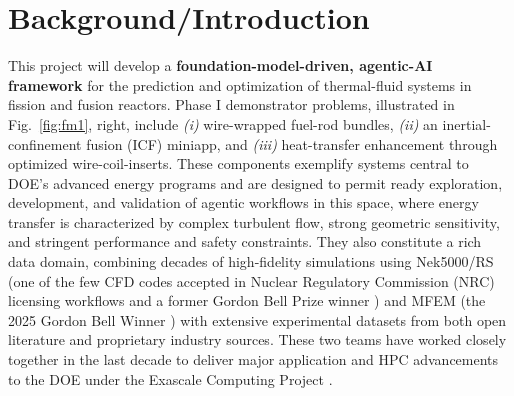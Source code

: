 

\section{Background/Introduction}

This project will develop a {\bf foundation-model-driven, agentic-AI framework}
\cite{Vinuesa2026XAI} for the prediction and optimization of thermal-fluid
systems in fission and fusion reactors.
  Phase I demonstrator problems, illustrated in Fig.~\ref{fig:fm1}, right, 
include 
{\em (i)} wire-wrapped fuel-rod bundles, 
{\em (ii)} an inertial-confinement fusion (ICF) miniapp, and 
{\em (iii)} heat-transfer enhancement through optimized wire-coil-inserts.
  These components exemplify systems central to DOE’s advanced energy
programs and are designed to permit ready exploration, development, and
validation of agentic workflows in this space, where
    energy transfer is characterized by complex turbulent flow, strong
geometric sensitivity, and stringent performance and safety constraints.
  They also constitute a rich data domain, combining decades of high-fidelity
simulations using Nek5000/RS (one of the few CFD codes accepted in Nuclear
Regulatory Commission (NRC)
licensing workflows and a former Gordon Bell Prize winner
\cite{tufo99a,gb23}) and MFEM (the 2025 Gordon Bell Winner \cite{gb25mfem}) 
with extensive experimental datasets from both open literature and proprietary
industry sources.  These two teams have worked closely together in the last
decade to deliver major application and HPC advancements to the DOE under the
Exascale Computing Project \cite{ceed}.  


